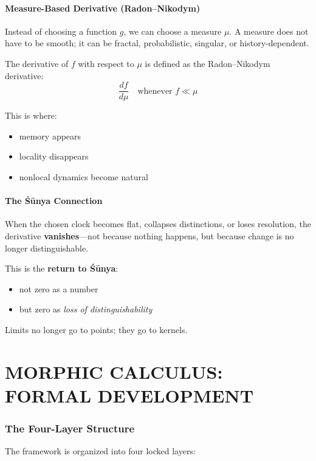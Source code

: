 \documentclass[12pt, oneside]{article}
\begin{document}
\subsection{Measure-Based Derivative (Radon--Nikodym)}

Instead of choosing a function $g$, we can choose a measure $\mu$. A measure does not have to be smooth; it can be fractal, probabilistic, singular, or history-dependent.

The derivative of $f$ with respect to $\mu$ is defined as the Radon--Nikodym derivative:
\begin{equation}
\frac{df}{d\mu} \quad \text{whenever } f \ll \mu
\end{equation}

This is where:
\begin{itemize}
    \item memory appears
    \item locality disappears
    \item nonlocal dynamics become natural
\end{itemize}

\subsection{The Śūnya Connection}

When the chosen clock becomes flat, collapses distinctions, or loses resolution, the derivative \textbf{vanishes}—not because nothing happens, but because change is no longer distinguishable.

This is the \textbf{return to Śūnya}:
\begin{itemize}
    \item not zero as a number
    \item but zero as \emph{loss of distinguishability}
\end{itemize}
Limits no longer go to points; they go to kernels.

\newpage

\part{MORPHIC CALCULUS: FORMAL DEVELOPMENT}

\section{The Four-Layer Structure}

The framework is organized into four locked layers:
\end{document}
